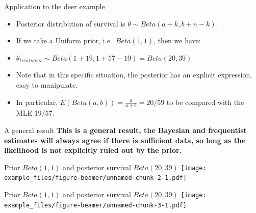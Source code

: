 \documentclass[
  ignorenonframetext,
  aspectratio=169]{beamer}
\providecommand{\tightlist}{%
  \setlength{\itemsep}{0pt}\setlength{\parskip}{0pt}}
\begin{document}
\begin{frame}{Application to the deer example}
\protect\hypertarget{application-to-the-deer-example}{}
\begin{itemize}[<+->]
\tightlist
\item
  Posterior distribution of survival is \(\theta \sim Beta(a+k,b+n-k)\).
\end{itemize}

\begin{itemize}[<+->]
\tightlist
\item
  If we take a Uniform prior, i.e.~\(Beta(1,1)\), then we have:
\end{itemize}

\begin{itemize}[<+->]
\tightlist
\item
  \(\theta_{treatment} \sim Beta(1+19,1+57-19)=Beta(20,39)\)
\end{itemize}

\begin{itemize}[<+->]
\tightlist
\item
  Note that in this specific situation, the posterior has an explicit
  expression, easy to manipulate.
\end{itemize}

\begin{itemize}[<+->]
\tightlist
\item
  In particular, \(E(Beta(a,b)) = \displaystyle{\frac{a}{a+b}} = 20/59\)
  to be compared with the MLE \(19/57\).
\end{itemize}
\end{frame}

\begin{frame}{A general result}
\protect\hypertarget{a-general-result}{}
\textbf{This is a general result, the Bayesian and frequentist estimates
will always agree if there is sufficient data, so long as the likelihood
is not explicitly ruled out by the prior.}
\end{frame}

\begin{frame}{Prior \(Beta(1,1)\) and posterior survival
\(Beta(20,39)\)}
\protect\hypertarget{prior-beta11-and-posterior-survival-beta2039}{}
\texttt{[image: example\_files/figure-beamer/unnamed-chunk-2-1.pdf]}
\end{frame}

\begin{frame}{Prior \(Beta(1,1)\) and posterior survival
\(Beta(20,39)\)}
\protect\hypertarget{prior-beta11-and-posterior-survival-beta2039-1}{}
\texttt{[image: example\_files/figure-beamer/unnamed-chunk-3-1.pdf]}
\end{frame}
\end{document}
